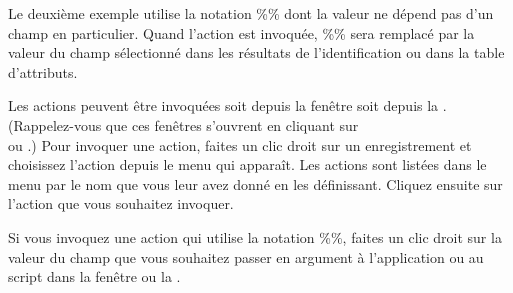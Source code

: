 Le deuxième exemple utilise la notation \%\% dont la valeur ne dépend pas d'un 
champ en particulier. Quand l'action est invoquée, \%\% sera remplacé par la 
valeur du champ sélectionné dans les résultats de l'identification ou dans la 
table d'attributs.

\label{label_usingactions}
Les actions peuvent être invoquées soit depuis la fenêtre  soit depuis la . (Rappelez-vous que ces 
fenêtres s'ouvrent en cliquant sur\\  ou .)
Pour invoquer une action, faites un clic droit sur un enregistrement et choisissez 
l'action depuis le menu qui apparaît. Les actions sont listées dans le menu par 
le nom que vous leur avez donné en les définissant. Cliquez ensuite sur l'action 
que vous souhaitez invoquer.

Si vous invoquez une action qui utilise la notation \%\%, faites un clic droit 
sur la valeur du champ que vous souhaitez passer en argument à l'application ou
 au script dans la fenêtre  ou la .

